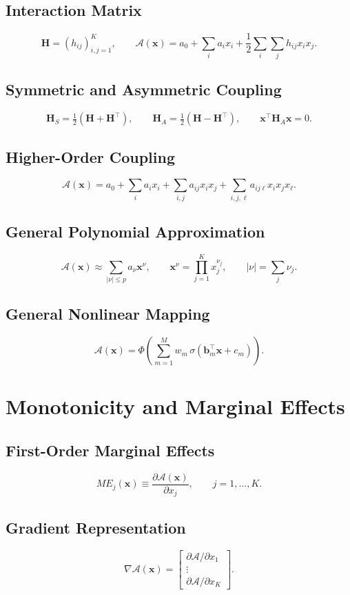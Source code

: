\documentclass[11pt]{article}
\begin{document}
\subsection{Interaction Matrix}
\[
\bm{H}=(h_{ij})_{i,j=1}^K,
\qquad \mathcal{A}(\bm{x})=a_0+\sum_i a_i x_i+\frac12\sum_i\sum_j h_{ij}x_ix_j.
\]

\subsection{Symmetric and Asymmetric Coupling}
\[
\bm{H}_S=\tfrac12(\bm{H}+\bm{H}^\top),
\qquad \bm{H}_A=\tfrac12(\bm{H}-\bm{H}^\top),
\qquad \bm{x}^\top\bm{H}_A\bm{x}=0.
\]

\subsection{Higher-Order Coupling}
\[
\mathcal{A}(\bm{x})=a_0+\sum_i a_i x_i+\sum_{i,j}a_{ij}x_ix_j+\sum_{i,j,\ell}a_{ij\ell}x_ix_jx_\ell.
\]

\subsection{General Polynomial Approximation}
\[
\mathcal{A}(\bm{x})\approx\sum_{|\nu|\le p} a_{\nu}\bm{x}^{\nu},
\qquad \bm{x}^{\nu}=\prod_{j=1}^K x_j^{\nu_j},
\qquad |\nu|=\sum_j\nu_j.
\]

\subsection{General Nonlinear Mapping}
\[
\mathcal{A}(\bm{x})=\Phi\!\left(\sum_{m=1}^M w_m\,\sigma(\bm{b}_m^\top\bm{x}+c_m)\right).
\]

\section{Monotonicity and Marginal Effects}

\subsection{First-Order Marginal Effects}
\[
ME_j(\bm{x})\equiv\frac{\partial \mathcal{A}(\bm{x})}{\partial x_j},
\qquad j=1,\dots,K.
\]

\subsection{Gradient Representation}
\[
\nabla\mathcal{A}(\bm{x})=
\begin{bmatrix}
\partial\mathcal{A}/\partial x_1\\
\vdots\\
\partial\mathcal{A}/\partial x_K
\end{bmatrix}.
\]
\end{document}
